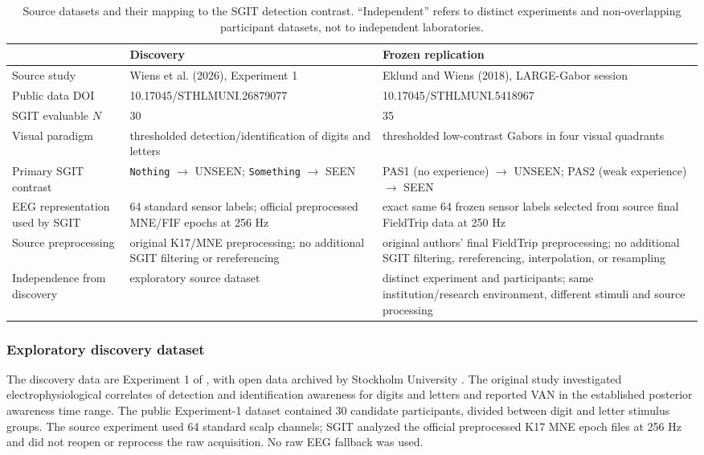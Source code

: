 \documentclass[12pt]{article}
\begin{document}
\begin{table}[t]
\centering\small
\caption{Source datasets and their mapping to the SGIT detection contrast. ``Independent'' refers to distinct experiments and non-overlapping participant datasets, not to independent laboratories.}
\label{tab:datasets}
\begin{tabularx}{\textwidth}{@{}p{}XX@{}}
\toprule
 & Discovery & Frozen replication\\
\midrule
Source study & Wiens et al. (2026), Experiment 1 \citep{Wiens2026} & Eklund and Wiens (2018), LARGE-Gabor session \citep{EklundWiens2018}\\
Public data DOI & 10.17045/STHLMUNI.26879077 & 10.17045/STHLMUNI.5418967\\
SGIT evaluable $N$ & 30 & 35\\
Visual paradigm & thresholded detection/identification of digits and letters & thresholded low-contrast Gabors in four visual quadrants\\
Primary SGIT contrast & \texttt{Nothing} $\rightarrow$ UNSEEN; \texttt{Something} $\rightarrow$ SEEN & PAS1 (no experience) $\rightarrow$ UNSEEN; PAS2 (weak experience) $\rightarrow$ SEEN\\
EEG representation used by SGIT & 64 standard sensor labels; official preprocessed MNE/FIF epochs at 256 Hz & exact same 64 frozen sensor labels selected from source final FieldTrip data at 250 Hz\\
Source preprocessing & original K17/MNE preprocessing; no additional SGIT filtering or rereferencing & original authors' final FieldTrip preprocessing; no additional SGIT filtering, rereferencing, interpolation, or resampling\\
Independence from discovery & exploratory source dataset & distinct experiment and participants; same institution/research environment, different stimuli and source processing\\
\bottomrule
\end{tabularx}
\end{table}

\subsubsection{Exploratory discovery dataset}
The discovery data are Experiment 1 of \citet{Wiens2026}, with open data archived by Stockholm University \citep{WiensData2026}. The original study investigated electrophysiological correlates of detection and identification awareness for digits and letters and reported VAN in the established posterior awareness time range. The public Experiment-1 dataset contained 30 candidate participants, divided between digit and letter stimulus groups. The source experiment used 64 standard scalp channels; SGIT analyzed the official preprocessed K17 MNE epoch files at 256 Hz and did not reopen or reprocess the raw acquisition. No raw EEG fallback was used.
\end{document}
